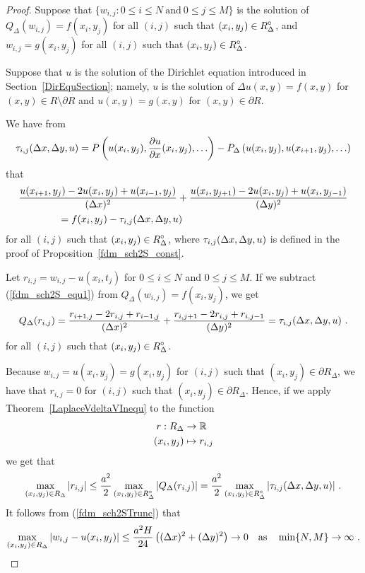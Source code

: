 \begin{proof}
Suppose that
$\{ w_{i,j} : 0 \leq i \leq N \ \text{and} \ 0 \leq j \leq M \}$
is the solution of $Q_\Delta(w_{i,j}) = f(x_i,y_j)$ for all
$(i,j)$ such that $\displaystyle (x_i,y_j) \in R^\circ_\Delta$, and
$w_{i,j} = g(x_i,y_j)$ for all $(i,j)$ such that
$\displaystyle (x_i,y_j) \in R^\circ_\Delta$.

Suppose that $u$ is the solution of the Dirichlet equation introduced
in Section~\ref{DirEquSection}; namely, $u$ is the solution of
$\Delta u(x,y)=f(x,y)$ for $(x,y) \in R \setminus \partial R$ and
$u(x,y) = g(x,y)$ for $(x,y) \in \partial R$.

We have from
\[
\tau_{i,j}(\Delta{x},\Delta{y},u)
= P\left(u(x_i,y_j) , \frac{\partial{u}}{\partial{x}}(x_i,y_j), \ldots\right)
- P_\Delta\left(u(x_i,y_j) , u(x_{i+1},y_j), \ldots\right)
\]
that
\begin{equation} \label{fdm_sch2S_equ1}
\begin{split}
&\frac{u(x_{i+1},y_j) - 2u(x_i,y_j) + u(x_{i-1},y_j)}{(\Delta{x})^2}
+ \frac{u(x_i,y_{j+1}) - 2u(x_i,y_j) + u(x_i,y_{j-1})}{(\Delta{y})^2} \\
&\qquad\qquad = f(x_i,y_j) - \tau_{i,j}(\Delta{x},\Delta{y},u)
\end{split}
\end{equation}
for all $(i,j)$ such that $\displaystyle (x_i,y_j) \in R^\circ_\Delta$, where
$\tau_{i,j}(\Delta{x},\Delta{y},u)$ is defined in the proof of
Proposition~\ref{fdm_sch2S_const}.

Let $r_{i,j} = w_{i,j} - u(x_i,t_j)$ for $0\leq i \leq N$ and
$0 \leq j \leq M$.  If we subtract (\ref{fdm_sch2S_equ1}) from
$Q_\Delta(w_{i,j}) = f(x_i,y_j)$, we get
\[
Q_\Delta(r_{i,j}) =
\frac{r_{i+1,j} - 2r_{i,j} + r_{i-1,j}}{(\Delta{x})^2}
+ \frac{r_{i,j+1} - 2r_{i,j} + r_{i,j-1}}{(\Delta{y})^2} =
\tau_{i,j}(\Delta{x},\Delta{y},u) \ .
\]
for all $(i,j)$ such that $\displaystyle (x_i,y_j) \in R^\circ_\Delta$.

Because $w_{i,j} = u(x_i,y_j) = g(x_i,y_j)$ for $(i,j)$ such that
$(x_i,y_j) \in \partial R_\Delta$, we have that
$r_{i,j} = 0$ for $(i,j)$ such that
$(x_i,y_j) \in \partial R_\Delta$.  Hence, if we apply
Theorem~\ref{LaplaceVdeltaVInequ} to the function
\begin{align*}
  r : R_\Delta & \to \mathbb{R} \\
  (x_i,y_j) & \mapsto r_{i,j}
\end{align*}
we get that
\[
\max_{(x_i,y_j) \in R_\Delta} |r_{i,j}|
\leq \frac{a^2}{2} \max_{(x_i,y_j) \in R^\circ_\Delta}
\left|Q_\Delta(r_{i,j})\right|
= \frac{a^2}{2}
\max_{(x_i,y_j) \in R^\circ_\Delta} |\tau_{i,j}(\dtx{x},\dtx{y},u)| \ .
\]
It follows from (\ref{fdm_sch2STrunc}) that
\[
\max_{(x_i,y_j) \in R_\Delta} |w_{i,j}-u(x_i,y_j)|
\leq \frac{a^2H}{24} \left( (\dtx{x})^2 + (\dtx{y})^2\right)
\to 0
\quad \text{as} \quad \min\{N,M\} \to \infty \ .  \qedhere
\]
\end{proof}


